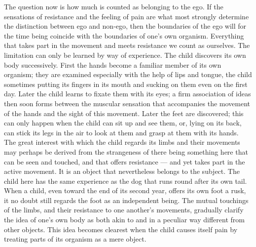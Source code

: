 \documentclass[12pt,a4paper]{book}
\newcommand{\opage}[1]{\marginnote{\footnotesize\textit{[#1]}}}
\begin{document}
The question now is how much is counted as belonging to the ego. If the
sensations of resistance and the feeling of pain are what most strongly
determine the distinction between ego and non-ego, then
\opage{6}the boundaries of the ego will for the time being coincide with
the boundaries of one's own organism. Everything that takes part in the
movement and meets resistance we count as ourselves. The limitation can
only be learned by way of experience. The child discovers its own body
successively. First the hands become a familiar member of its own
organism; they are examined especially with the help of lips and tongue,
the child sometimes putting its fingers in its mouth and sucking on them
even on the first day. Later the child learns to fixate them with its
eyes; a firm association of ideas then soon forms between the muscular
sensation that accompanies the movement of the hands and the sight of
this movement. Later the feet are discovered; this can only happen when
the child can sit up and see them, or, lying on its back, can stick its
legs in the air to look at them and grasp at them with its hands. The
great interest with which the child regards its limbs and their
movements may perhaps be derived from the strangeness of there being
something here that can be seen and touched, and that offers resistance
--- and yet takes part in the active movement. It is an object that
nevertheless belongs to the subject. The child here has the same
experience as the dog that runs round after its own tail. When a child,
even toward the end of its second year, offers its own foot a rusk, it
no doubt still regards the foot as an independent being. The mutual
touchings of the limbs, and their resistance to one another's movements,
gradually clarify the idea of one's own body as both akin to and in a
peculiar way different from other objects. This idea becomes clearest
when the child causes itself pain by treating parts of its organism as a
mere object.
\end{document}
